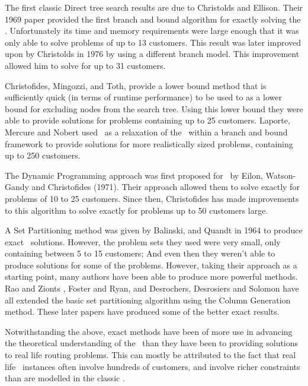 The first classic Direct tree search results are due to Christolds and Ellison. Their 1969 paper provided the first branch and bound algorithm for exactly solving the \VRP\cite{CE:1969}. Unfortunately its time and memory requirements were large enough that it was only able to solve problems of up to 13 customers. This result was later improved upon by Christolds in 1976 by using a different branch model. This improvement allowed him to solve for up to 31 customers. 

Christofides, Mingozzi, and Toth\cite{CMT:1981}, provide a lower bound method that is sufficiently quick (in terms of runtime performance) to be used to as a lower bound for excluding nodes from the search tree. Using this lower bound they were able to provide solutions for problems containing up to 25 customers. Laporte, Mercure and Nobert\cite{LMN:1986} used \MTSP\ as a relaxation of the \VRP\ within a branch and bound framework to provide solutions for more realistically sized problems, containing up to 250 customers.  

The Dynamic Programming approach was first proposed for \VRP\ by Eilon, Watson-Gandy and Christofides (1971). Their approach allowed them to solve exactly for problems of 10 to 25 customers. Since then, Christofides has made improvements to this algorithm to solve exactly for problems up to 50 customers large.

A Set Partitioning method was given by Balinski, and Quandt in 1964\cite{balinski:64} to produce exact \VRP\ solutions. However, the problem sets they used were very small, only containing between 5 to 15 customers; And even then they weren't able to produce solutions for some of the problems. However, taking their approach as a starting point, many authors have been able to produce more powerful methods. Rao and Zionts \cite{RZ:1968}, Foster and Ryan\cite{FR:1976}, and Desrochers, Desrosiers and Solomon\cite{DMDJSM:1992} have all extended the basic set partitioning algorithm using the Column Generation method. These later papers have produced some of the better exact results. 

Notwithstanding the above, exact methods have been of more use in advancing the theoretical understanding of the \VRP\ than they have been to providing solutions to real life routing problems. This can mostly be attributed to the fact that real life \VRP\ instances often involve hundreds of customers, and involve richer constraints than are modelled in the classic \VRP.

